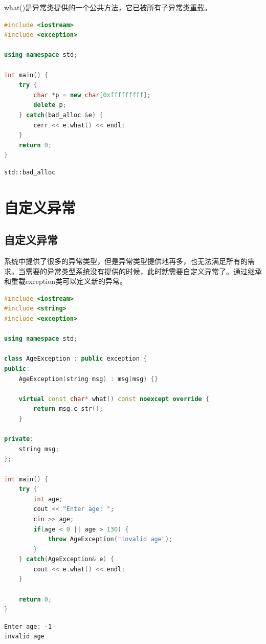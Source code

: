 what()是异常类提供的一个公共方法，它已被所有子异常类重载。 \\


\begin{lstlisting}[language=C++]
#include <iostream>
#include <exception>

using namespace std;

int main() {
    try {
        char *p = new char[0xfffffffff];
        delete p;
    } catch(bad_alloc &e) {
        cerr << e.what() << endl;
    }
    return 0;
}
\end{lstlisting}

\begin{tcolorbox}
	\begin{verbatim}
std::bad_alloc
	\end{verbatim}
\end{tcolorbox}

\newpage

\section{自定义异常}

\subsection{自定义异常}

系统中提供了很多的异常类型，但是异常类型提供地再多，也无法满足所有的需求。当需要的异常类型系统没有提供的时候，此时就需要自定义异常了。通过继承和重载exception类可以定义新的异常。 \\


\begin{lstlisting}[language=C++]
#include <iostream>
#include <string>
#include <exception>

using namespace std;

class AgeException : public exception {
public:
    AgeException(string msg) : msg(msg) {}

    virtual const char* what() const noexcept override {
        return msg.c_str();
    }

private:
    string msg;
};

int main() {
    try {
        int age;
        cout << "Enter age: ";
        cin >> age;
        if(age < 0 || age > 130) {
            throw AgeException("invalid age");
        }
    } catch(AgeException& e) {
        cout << e.what() << endl;
    }

    return 0;
}
\end{lstlisting}

\begin{tcolorbox}
	\begin{verbatim}
Enter age: -1
invalid age
	\end{verbatim}
\end{tcolorbox}

\newpage
